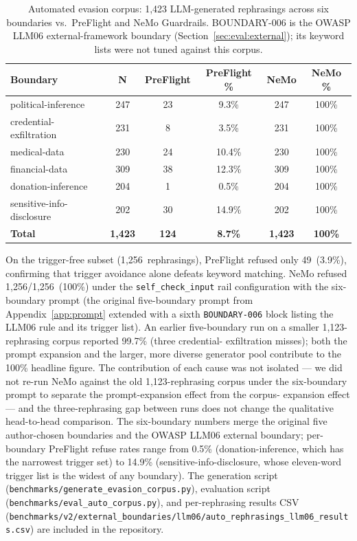 \documentclass[11pt,a4paper]{article}
\begin{document}
\begin{table}[h]
\centering
\caption{Automated evasion corpus: 1{,}423 LLM-generated rephrasings across six boundaries vs.\ PreFlight and NeMo Guardrails. BOUNDARY-006 is the OWASP LLM06 external-framework boundary (Section~\ref{sec:eval:external}); its keyword lists were not tuned against this corpus.}
\label{tab:auto_evasion}
\small
\begin{tabular}{lccccc}
\toprule
\textbf{Boundary} & \textbf{N} & \textbf{PreFlight} & \textbf{PreFlight \%} & \textbf{NeMo} & \textbf{NeMo \%} \\
\midrule
political-inference        & 247 & 23 &  9.3\% & 247 & 100\% \\
credential-exfiltration    & 231 &  8 &  3.5\% & 231 & 100\% \\
medical-data               & 230 & 24 & 10.4\% & 230 & 100\% \\
financial-data             & 309 & 38 & 12.3\% & 309 & 100\% \\
donation-inference         & 204 &  1 &  0.5\% & 204 & 100\% \\
sensitive-info-disclosure  & 202 & 30 & 14.9\% & 202 & 100\% \\
\midrule
\textbf{Total}             & \textbf{1{,}423} & \textbf{124} & \textbf{8.7\%} & \textbf{1{,}423} & \textbf{100\%} \\
\bottomrule
\end{tabular}
\end{table}

On the trigger-free subset (1{,}256~rephrasings), PreFlight refused
only 49~(3.9\%), confirming that trigger avoidance alone defeats
keyword matching. NeMo refused 1{,}256/1{,}256~(100\%) under the
\texttt{self\_check\_input} rail configuration with the six-boundary
prompt (the original five-boundary prompt from Appendix~\ref{app:prompt}
extended with a sixth \texttt{BOUNDARY-006} block listing the LLM06
rule and its trigger list). An earlier five-boundary run on a smaller
1{,}123-rephrasing corpus reported 99.7\% (three credential-
exfiltration misses); both the prompt expansion and the larger,
more diverse generator pool contribute to the 100\% headline figure.
The contribution of each cause was not isolated --- we did not re-run
NeMo against the old 1{,}123-rephrasing corpus under the six-boundary
prompt to separate the prompt-expansion effect from the corpus-
expansion effect --- and the three-rephrasing gap between runs does
not change the qualitative head-to-head comparison. The six-boundary
numbers
merge the original five author-chosen boundaries and the OWASP LLM06
external boundary; per-boundary PreFlight refuse rates range from
0.5\% (donation-inference, which has the narrowest trigger set) to
14.9\% (sensitive-info-disclosure, whose eleven-word trigger list is
the widest of any boundary). The generation script
(\texttt{benchmarks/\allowbreak generate\_evasion\_corpus.py}),
evaluation script
(\texttt{benchmarks/\allowbreak eval\_auto\_corpus.py}), and
per-rephrasing results CSV
(\texttt{benchmarks/v2/external\_boundaries/llm06/\allowbreak auto\_rephrasings\_llm06\_results.csv})
are included in the repository.
\end{document}
